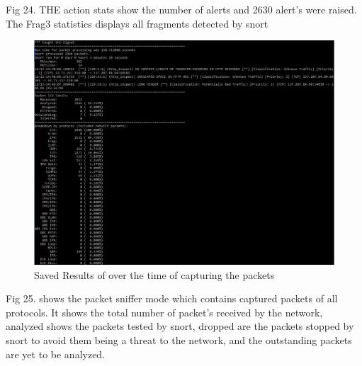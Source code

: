 \documentclass{article}
\begin{document}
Fig 24. THE action stats show the number of alerts and 2630 alert's were raised. The Frag3 statistics displays all fragments detected by snort 

\begin{figure}[H]
	\begin{center}
		\includegraphics[width=0.6
\textwidth]{Res3.jpg}
	\end{center}
	\caption{Saved Results of over the time of capturing the packets}
	\label{fig:Res3}
\end{figure}

Fig 25. shows the packet sniffer mode which contains captured packets of all protocols. It shows the total number of packet's received by the network, analyzed shows the packets tested by snort, dropped are the packets stopped by snort to avoid them being a threat to the network, and the outstanding packets are yet to be analyzed. 
\newpage
\tableofcontents



\end{document}
